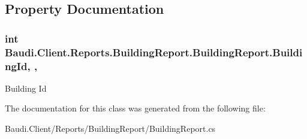 \subsection{Property Documentation}
\hypertarget{class_baudi_1_1_client_1_1_reports_1_1_building_report_1_1_building_report_a064a73af91e02fb3420e9ee5b56e49d4}{}
\subsubsection[{Building\+Id}]{\setlength{\rightskip}{0pt plus 5cm}int Baudi.\+Client.\+Reports.\+Building\+Report.\+Building\+Report.\+Building\+Id\hspace{0.3cm}{\ttfamily [get]}, {\ttfamily [set]}, {\ttfamily [protected]}}\label{class_baudi_1_1_client_1_1_reports_1_1_building_report_1_1_building_report_a064a73af91e02fb3420e9ee5b56e49d4}


Building Id 



The documentation for this class was generated from the following file\+:\begin{DoxyCompactItemize}
\item 
Baudi.\+Client/\+Reports/\+Building\+Report/Building\+Report.\+cs\end{DoxyCompactItemize}
